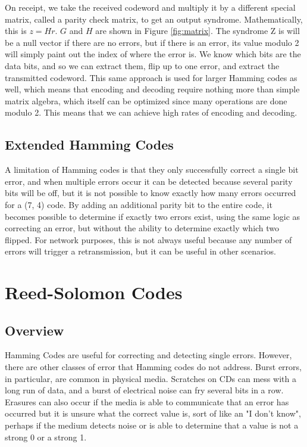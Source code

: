 \documentclass[12pt]{article}
\begin{document}
On receipt, we take the received codeword and multiply it by a different special matrix, called a parity check matrix, to get an output syndrome. Mathematically, this is $z = Hr$. $G$ and $H$ are shown in Figure \ref{fig:matrix}. The syndrome Z is will be a null vector if there are no errors, but if there is an error, its value modulo 2 will simply paint out the index of where the error is. We know which bits are the data bits, and so we can extract them, flip up to one error, and extract the transmitted codeword. This same approach is used for larger Hamming codes as well, which means that encoding and decoding require nothing more than simple matrix algebra, which itself can be optimized since many operations are done modulo 2. This means that we can achieve high rates of encoding and decoding.\cite{wolf}

\subsection{Extended Hamming Codes}

A limitation of Hamming codes is that they only successfully correct a single bit error, and when multiple errors occur it can be detected because several parity bits will be off, but it is not possible to know exactly how many errors occurred for a (7, 4) code. By adding an additional parity bit to the entire code, it becomes possible to determine if exactly two errors exist, using the same logic as correcting an error, but without the ability to determine exactly which two flipped. For network purposes, this is not always useful because any number of errors will trigger a retransmission, but it can be useful in other scenarios. \cite{wiki}

\section{Reed-Solomon Codes}

\subsection{Overview}

Hamming Codes are useful for correcting and detecting single errors. However, there are other classes of error that Hamming codes do not address. Burst errors, in particular, are common in physical media. Scratches on CDs can mess with a long run of data, and a burst of electrical noise can fry several bits in a row. Erasures can also occur if the media is able to communicate that an error has occurred but it is unsure what the correct value is, sort of like an "I don't know", perhaps if the medium detects noise or is able to determine that a value is not a strong 0 or a strong 1.
\end{document}
